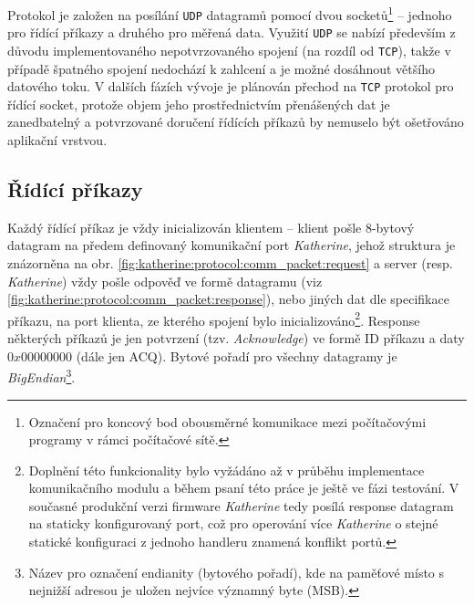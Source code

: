 Protokol je založen na posílání \texttt{UDP} datagramů pomocí dvou socketů\footnote{Označení pro koncový bod obousměrné komunikace mezi počítačovými programy v rámci počítačové sítě.} -- jednoho pro řídící příkazy a druhého pro měřená data. Využití \texttt{UDP} se nabízí především z důvodu implementovaného nepotvrzovaného spojení (na rozdíl od \texttt{TCP}), takže v případě špatného spojení nedochází k zahlcení a je možné dosáhnout většího datového toku. V dalších fázích vývoje je plánován přechod na \texttt{TCP} protokol pro řídící socket, protože objem jeho prostřednictvím přenášených dat je zanedbatelný a potvrzované doručení řídících příkazů by nemuselo být ošetřováno aplikační vrstvou.

\subsection{Řídící příkazy}\label{chap:katherine:protocol:control_commands}
Každý řídící příkaz je vždy inicializován klientem -- klient pošle 8-bytový datagram na předem definovaný komunikační port \textit{Katherine}, jehož struktura je znázorněna na obr. \ref{fig:katherine:protocol:comm_packet:request} a server (resp. \textit{Katherine}) vždy pošle odpověď ve formě datagramu (viz \ref{fig:katherine:protocol:comm_packet:response}), nebo jiných dat dle specifikace příkazu, na port klienta, ze kterého spojení bylo inicializováno\footnote{Doplnění této funkcionality bylo vyžádáno až v průběhu implementace komunikačního modulu a během psaní této práce je ještě ve fázi testování. V současné produkční verzi firmware \textit{Katherine} tedy posílá response datagram na staticky konfigurovaný port, což pro operování více \textit{Katherine} o stejné statické konfiguraci z jednoho handleru znamená konflikt portů.}. Response některých příkazů je jen potvrzení (tzv. \textit{Acknowledge}) ve formě ID příkazu a daty $0x00000000$ (dále jen ACQ). Bytové pořadí pro všechny datagramy je \textit{BigEndian}\footnote{Název pro označení endianity (bytového pořadí), kde na paměťové místo s nejnižší adresou je uložen nejvíce významný byte (MSB).}.

